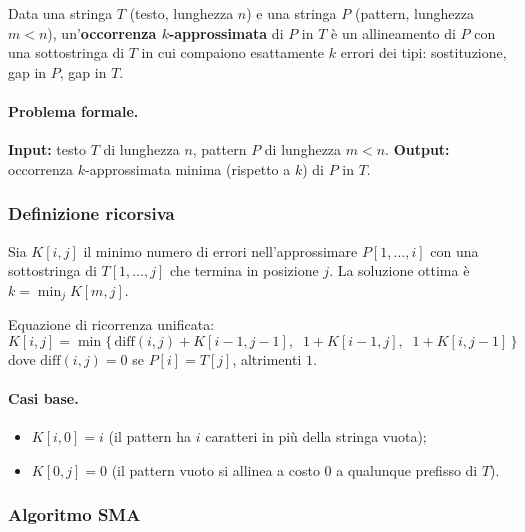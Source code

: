 \begin{definizione}
Data una stringa $T$ (testo, lunghezza $n$) e una stringa $P$ (pattern,
lunghezza $m < n$), un'\textbf{occorrenza $k$-approssimata} di $P$ in $T$ è un
allineamento di $P$ con una sottostringa di $T$ in cui compaiono esattamente $k$
errori dei tipi: sostituzione, gap in $P$, gap in $T$.
\end{definizione}

\paragraph{Problema formale.}
\textbf{Input:} testo $T$ di lunghezza $n$, pattern $P$ di lunghezza $m < n$.
\textbf{Output:} occorrenza $k$-approssimata minima (rispetto a $k$) di $P$ in $T$.

\subsubsection{Definizione ricorsiva}

Sia $K[i,j]$ il minimo numero di errori nell'approssimare $P[1,\ldots,i]$ con una
sottostringa di $T[1,\ldots,j]$ che termina in posizione $j$. La soluzione ottima è
$k = \min_j K[m, j]$.

Equazione di ricorrenza unificata:
\[
K[i,j] = \min\bigl\{\,\mathrm{diff}(i,j) + K[i-1,j-1],\;\;
1 + K[i-1,j],\;\;
1 + K[i,j-1]\,\bigr\}
\]
dove $\mathrm{diff}(i,j) = 0$ se $P[i] = T[j]$, altrimenti $1$.

\paragraph{Casi base.}
\begin{itemize}
\item $K[i, 0] = i$ \quad (il pattern ha $i$ caratteri in più della stringa vuota);
\item $K[0, j] = 0$ \quad (il pattern vuoto si allinea a costo $0$ a qualunque prefisso di $T$).
\end{itemize}

\subsubsection{Algoritmo \textsc{SMA}}

